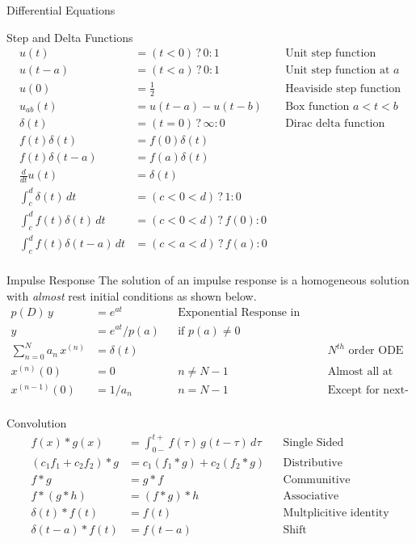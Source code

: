 \begin{section}{Differential Equations}
\begin{subsection}{Step and Delta Functions}
    \begin{align*}
      u(t) &= (t<0) \,?\, 0 : 1 && \text{Unit step function}\\
      u(t-a) &= (t<a) \,?\, 0 : 1 && \text{Unit step function at $a$}\\
      u(0) &= \frac{1}{2} && \text{Heaviside step function}\\
      u_{ab}(t) &= u(t-a) - u(t-b) && \text{Box function $a<t<b$}\\
      \delta(t) &= (t=0)\,?\,\infty : 0 && \text{Dirac delta function}\\
      f(t)\delta(t) &= f(0)\delta(t) \\
      f(t)\delta(t-a) &= f(a)\delta(t) \\
      \frac{d}{dt}u(t) &= \delta(t)\\
      \int_c^d \delta(t)\,dt &= (c<0<d)\,?\,1:0 \\
      \int_c^d f(t)\delta(t)\,dt &= (c<0<d)\,?\,f(0):0 \\
      \int_c^d f(t)\delta(t-a)\,dt &= (c<a<d)\,?\,f(a):0 \\
    \end{align*}
  \end{subsection}

  \begin{subsection}{Impulse Response}
    The solution of an impulse response is a homogeneous solution with
    {\em almost} rest initial conditions as shown below.
    \begin{align*}
       p(D)\,y &= e^{at} && \text{Exponential Response in operator form} \\
       y &= e^{at}/p(a) && \text{if $p(a) \ne 0$} \\
      \sum_{n=0}^{N} a_n\,x^{(n)} &= \delta(t) && && \text{$N^{th}$ order ODE} \\
      x^{(n)}(0) &= 0 && n \ne N-1 && \text{Almost all at rest} \\
      x^{(n-1)}(0) &= 1/a_n && n = N-1 && \text{Except for next-to-last} \\
    \end{align*}
  \end{subsection}

  \begin{subsection}{Convolution}
    \begin{align*}
      f(x) \ast g(x) &= \int_{0-}^{t+} f(\tau)\,g(t-\tau)\,d\tau &&
      \text{Single Sided}\\
      (c_1f_1 + c_2f_2) \ast g &= c_1(f_1 \ast g) + c_2(f_2 \ast g) &&
      \text{Distributive}\\
      f \ast g &= g \ast f && \text{Communitive} \\
      f \ast (g \ast h) &= (f \ast g) \ast h && \text{Associative} \\
      \delta(t) \ast f(t) &= f(t) && \text{Multplicitive identity} \\
      \delta(t-a) \ast f(t) &= f(t-a) && \text{Shift} \\
    \end{align*}
  \end{subsection}


\end{section}
